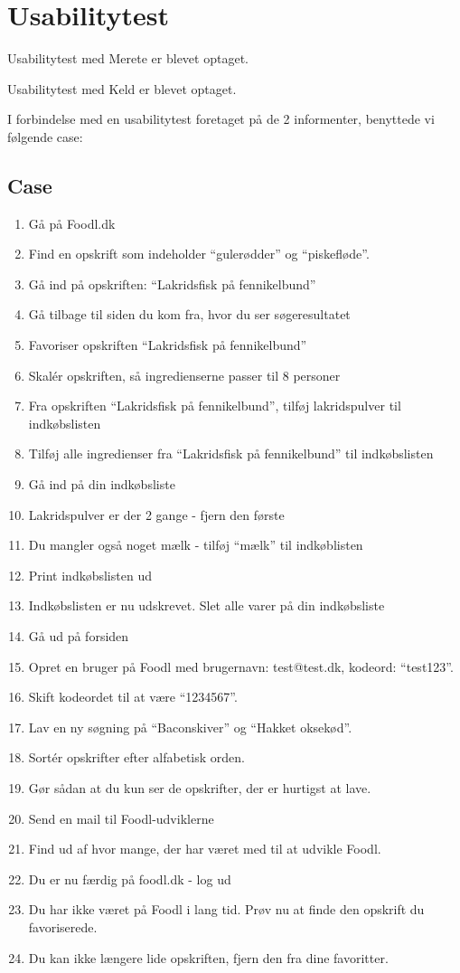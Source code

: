 \chapter{Usabilitytest}
\label{ap:usabilitytest}

Usabilitytest med Merete er blevet optaget\cite{usabilitymerete}.

Usabilitytest med Keld er blevet optaget\cite{usabilitykjeld}.

I forbindelse med en usabilitytest foretaget på de 2 informenter, benyttede vi følgende case:

\section{Case}
\begin{enumerate}
\item Gå på Foodl.dk
\item Find en opskrift som indeholder ``gulerødder'' og ``piskefløde''.
\item Gå ind på opskriften: ``Lakridsfisk på fennikelbund''
\item Gå tilbage til siden du kom fra, hvor du ser søgeresultatet
\item Favoriser opskriften ``Lakridsfisk på fennikelbund''
\item Skalér opskriften, så ingredienserne passer til 8 personer
\item Fra opskriften ``Lakridsfisk på fennikelbund'', tilføj lakridspulver til indkøbslisten
\item Tilføj alle ingredienser fra ``Lakridsfisk på fennikelbund'' til indkøbslisten
\item Gå ind på din indkøbsliste
\item Lakridspulver er der 2 gange - fjern den første
\item Du mangler også noget mælk - tilføj ``mælk'' til indkøblisten
\item Print indkøbslisten ud
\item Indkøbslisten er nu udskrevet. Slet alle varer på din indkøbsliste
\item Gå ud på forsiden
\item Opret en bruger på Foodl med brugernavn: test@test.dk, kodeord: ``test123''.
\item Skift kodeordet til at være “1234567”.
\item Lav en ny søgning på ``Baconskiver'' og ``Hakket oksekød''.
\item Sortér opskrifter efter alfabetisk orden.
\item Gør sådan at du kun ser de opskrifter, der er hurtigst at lave.
\item Send en mail til Foodl-udviklerne
\item Find ud af hvor mange, der har været med til at udvikle Foodl.
\item Du er nu færdig på foodl.dk - log ud
\item Du har ikke været på Foodl i lang tid. Prøv nu at finde den opskrift du favoriserede.
\item Du kan ikke længere lide opskriften, fjern den fra dine favoritter.
\end{enumerate}
